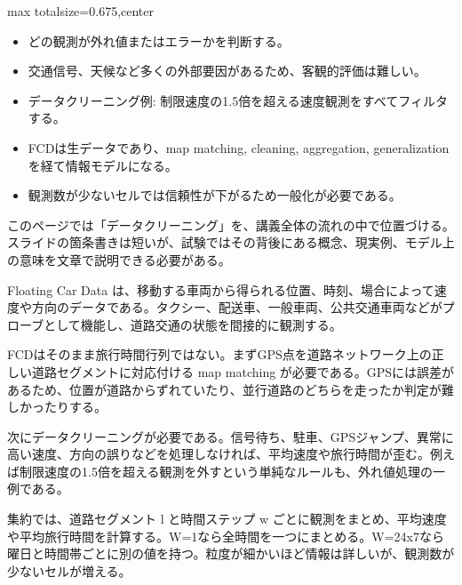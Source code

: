 \clearpage
{}
\begin{adjustbox}{max totalsize={\textwidth}{0.675\textheight},center}
\begin{minipage}{\textwidth}\scriptsize
\begin{minipage}[t]{0.485\textwidth}
\begin{itemize}
\item どの観測が外れ値またはエラーかを判断する。
\item 交通信号、天候など多くの外部要因があるため、客観的評価は難しい。
\item データクリーニング例: 制限速度の1.5倍を超える速度観測をすべてフィルタする。
\end{itemize}
\begin{itemize}
\item FCDは生データであり、map matching, cleaning, aggregation, generalization を経て情報モデルになる。
\item 観測数が少ないセルでは信頼性が下がるため一般化が必要である。
\end{itemize}
\end{minipage}\hfill
\begin{minipage}[t]{0.485\textwidth}
このページでは「データクリーニング」を、講義全体の流れの中で位置づける。スライドの箇条書きは短いが、試験ではその背後にある概念、現実例、モデル上の意味を文章で説明できる必要がある。\par
Floating Car Data は、移動する車両から得られる位置、時刻、場合によって速度や方向のデータである。タクシー、配送車、一般車両、公共交通車両などがプローブとして機能し、道路交通の状態を間接的に観測する。\par
FCDはそのまま旅行時間行列ではない。まずGPS点を道路ネットワーク上の正しい道路セグメントに対応付ける map matching が必要である。GPSには誤差があるため、位置が道路からずれていたり、並行道路のどちらを走ったか判定が難しかったりする。\par
次にデータクリーニングが必要である。信号待ち、駐車、GPSジャンプ、異常に高い速度、方向の誤りなどを処理しなければ、平均速度や旅行時間が歪む。例えば制限速度の1.5倍を超える観測を外すという単純なルールも、外れ値処理の一例である。\par
集約では、道路セグメント l と時間ステップ w ごとに観測をまとめ、平均速度や平均旅行時間を計算する。W=1なら全時間を一つにまとめる。W=24x7なら曜日と時間帯ごとに別の値を持つ。粒度が細かいほど情報は詳しいが、観測数が少ないセルが増える。\par

\end{minipage}
\end{minipage}
\end{adjustbox}
